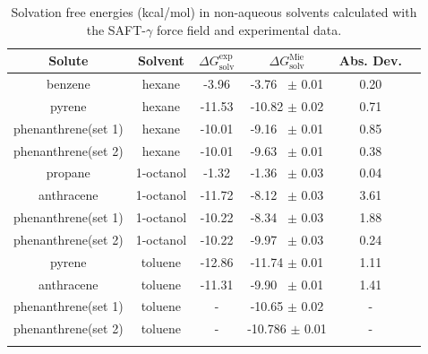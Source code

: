 \documentclass[preprint]{elsarticle}
\begin{document}
	\begin{table}
		\centering
		\caption{Solvation free energies (kcal/mol) in non-aqueous solvents calculated with the SAFT-$\gamma$ force field and experimental data.}
		\label{tbl:solv1}
		\begin{tabular}{cccccc}
			\hline\hline
			Solute       & Solvent   & $\Delta G_\text{solv}^\text{exp}$ & $\Delta G_\text{solv}^\text{Mie}$ & Abs. Dev.  \\ \hline
			benzene      & hexane    & -3.96                   & -3.76  $\,$ $\pm$ 0.01       & 0.20      &  \\
			pyrene       & hexane    & -11.53                  & -10.82 $\pm$ 0.02       & 0.71      &  \\
			phenanthrene(set 1) & hexane    & -10.01                  & -9.16  $\,$ $\pm$ 0.01       & 0.85      &  \\
			phenanthrene(set 2) & hexane    & -10.01                  & -9.63  $\,$ $\pm$ 0.01       & 0.38     &  \\
			propane      & 1-octanol & -1.32                   & -1.36  $\,$ $\pm$ 0.03       & 0.04      &  \\
			anthracene   & 1-octanol & -11.72                  & -8.12   $\,$ $\pm$ 0.03       & 3.61      &  \\
			phenanthrene(set 1) & 1-octanol & -10.22                  & -8.34  $\,$ $\pm$ 0.03       & 1.88      &  \\
			phenanthrene(set 2) & 1-octanol & -10.22                  & -9.97  $\,$ $\pm$ 0.03       & 0.24     &  \\			
			pyrene       & toluene   & -12.86                  & -11.74 $\pm$ 0.01       & 1.11      &  \\
			anthracene   & toluene   & -11.31                  & -9.90 $\,$ $\pm$ 0.01        & 1.41      &  \\ 
			phenanthrene(set 1)   & toluene   & -                  & -10.65 $\pm$ 0.02      & -     &  \\ 
			phenanthrene(set 2)   & toluene   & -                  & -10.786	 $\pm$  0.01        & -      &  \\ 
			\hline\hline
			&
		\end{tabular}
	\end{table}
\end{document}
